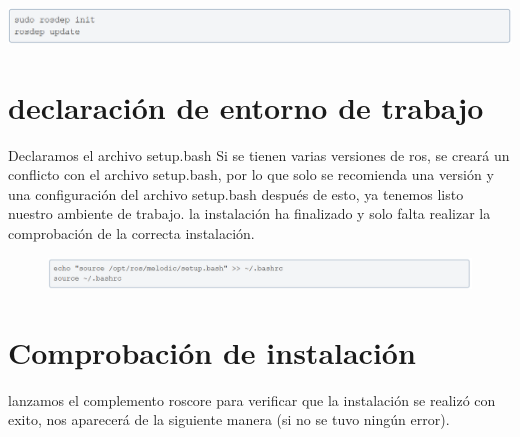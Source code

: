 \documentclass[12pt,a4paper]{report}
\begin{document}
\begin{center}
\includegraphics[scale=.8]{link16.png}
\end{center}

\section{declaración de entorno de trabajo}
Declaramos el archivo setup.bash
Si se tienen varias versiones de ros, se creará un conflicto con el archivo setup.bash, por lo que solo se recomienda una versión y una configuración del archivo setup.bash
después de esto, ya tenemos listo nuestro ambiente de trabajo. la instalación ha finalizado y solo falta realizar la comprobación de la correcta instalación.

\begin{figure}[h]
\includegraphics[scale=.8]{link17.png}
\end{figure}

\section{Comprobación de instalación}
lanzamos el complemento roscore para verificar que la instalación se realizó con exito, nos aparecerá de la siguiente manera (si no se tuvo ningún error).
\end{document}

